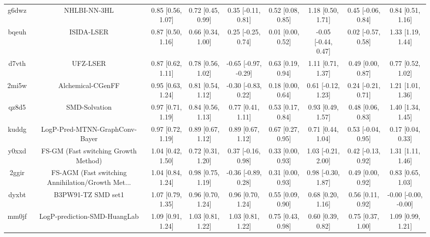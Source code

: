 \documentclass{article}
\begin{document}
\begin{center}
\begin{longtable}{|ccccccccc|}
 g6dwz &                                       NHLBI-NN-3HL &  0.85 [0.56, 1.07] &  0.72 [0.45, 0.99] &    0.35 [-0.11, 0.81] &  0.52 [0.08, 0.85] &    1.18 [0.50, 1.71] &   0.45 [-0.06, 0.84] &     0.84 [0.51, 1.16] \\
 bqeuh &                                         ISIDA-LSER &  0.87 [0.50, 1.16] &  0.66 [0.34, 1.00] &    0.25 [-0.25, 0.74] &  0.01 [0.00, 0.52] &  -0.05 [-0.44, 0.47] &   0.02 [-0.57, 0.58] &     1.33 [1.19, 1.44] \\
 d7vth &                                           UFZ-LSER &  0.87 [0.62, 1.11] &  0.78 [0.56, 1.02] &  -0.65 [-0.97, -0.29] &  0.63 [0.19, 0.94] &    1.11 [0.71, 1.37] &    0.49 [0.00, 0.87] &     0.77 [0.52, 1.02] \\
 2mi5w &                                  Alchemical-CGenFF &  0.95 [0.63, 1.24] &  0.81 [0.54, 1.12] &   -0.30 [-0.83, 0.22] &  0.18 [0.00, 0.64] &   0.61 [-0.12, 1.23] &   0.24 [-0.21, 0.71] &     1.21 [1.01, 1.36] \\
 qz8d5 &                                      SMD-Solvation &  0.97 [0.71, 1.19] &  0.84 [0.56, 1.13] &     0.77 [0.41, 1.11] &  0.53 [0.17, 0.84] &    0.93 [0.49, 1.57] &    0.48 [0.06, 0.83] &     1.40 [1.34, 1.45] \\
 kuddg &                     LogP-Pred-MTNN-GraphConv-Bayer &  0.97 [0.72, 1.19] &  0.89 [0.67, 1.12] &     0.89 [0.67, 1.12] &  0.67 [0.27, 0.95] &    0.71 [0.44, 1.04] &   0.53 [-0.04, 0.95] &     0.17 [0.04, 0.33] \\
 y0xxd &               FS-GM (Fast switching Growth Method) &  1.04 [0.42, 1.50] &  0.72 [0.31, 1.20] &    0.37 [-0.16, 0.98] &  0.33 [0.00, 0.93] &   1.03 [-0.21, 2.00] &   0.42 [-0.13, 0.92] &     1.31 [1.11, 1.46] \\
 2ggir &  FS-AGM (Fast switching Annihilation/Growth Met... &  1.04 [0.84, 1.24] &  0.98 [0.75, 1.19] &   -0.36 [-0.89, 0.28] &  0.31 [0.00, 0.93] &   0.98 [-0.30, 1.87] &    0.49 [0.00, 0.92] &     0.83 [0.65, 1.03] \\
 dyxbt &                                 B3PW91-TZ SMD set1 &  1.07 [0.79, 1.35] &  0.96 [0.70, 1.24] &     0.96 [0.70, 1.24] &  0.55 [0.09, 0.90] &    0.68 [0.20, 1.16] &    0.56 [0.11, 0.92] &  -0.00 [-0.00, -0.00] \\
 mm0jf &                       LogP-prediction-SMD-HuangLab &  1.09 [0.91, 1.24] &  1.03 [0.81, 1.22] &     1.03 [0.81, 1.22] &  0.75 [0.43, 0.98] &    0.60 [0.39, 0.82] &    0.75 [0.37, 1.00] &     1.09 [0.99, 1.21] \\

\end{longtable}
\end{center}
\end{document}
